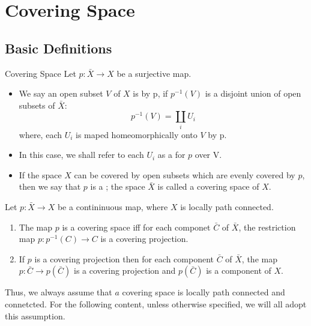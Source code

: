 \documentclass[../main.tex]{subfiles}
\begin{document}
\chapter{ Covering Space }

\section{Basic Definitions}
\begin{definition}{Covering Space}{}
    Let \(  p:\bar{X}\to X  \) be a surjective map. 
    \begin{itemize}
        \item We say an open subset  \(  V  \) of \(  X  \) is  by p, if \(  p ^{-1} \left( V \right)   \) is a disjoint union of open subsets of \(  \bar{X}  \):  \[
    p ^{-1} \left( V \right)= \coprod _{i}U_{i} 
    \] where, each \(  U_{i}  \) is maped homeomorphically onto \(  V  \) by p.
    \item In this case, we shall refer to each \(  U_{i}  \) as a   for \(  p  \) over V. 
      \item If the space \(  X  \) can be covered by open subsets which are evenly covered by \(  p  \), then we say that \(  p  \) is a ; the space \(  \bar{X}  \) is called a covering space of \(  X  \). 
    \end{itemize}
    
    
\end{definition}

\begin{theorem}{}{}
    Let \(  p: \bar{X}  \to X\) be a contininuous map, where \(  X  \) is locally path connected.  \begin{enumerate}
        \item The map \(  p  \) is a covering space iff for each componet \(  \bar{C}  \) of \(  \bar{X}  \), the restriction map \(  p: p ^{-1} \left( C \right) \to C   \) is a covering projection.    
        \item If \(  p  \) is a covering projection then for each component \(  \bar{C}  \) of \(  \bar{X}  \), the map \(  p: \bar{C} \to p\left(  \bar{C}\right)   \) is a covering projection and \(  p\left( \bar{C} \right)   \) is a component of \(  X  \).     
    \end{enumerate}
    
\end{theorem}

\begin{remark}
    Thus, we always assume that \(  a   \) covering space is locally path connected and connetcted. For the following content, unless otherwise specified, we will all adopt this assumption.
\end{remark}
\end{document}
